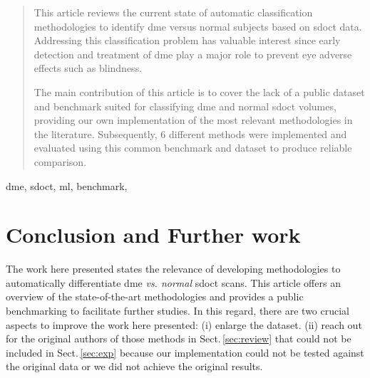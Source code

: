 \documentclass[conference,twocolumn,a4,10pt]{latex/IEEEtran}
\begin{document}

\maketitle

\begin{abstract}
This article reviews the current state of automatic classification methodologies to identify \gls{dme} versus normal subjects based on \gls{sdoct} data.
Addressing this classification problem has valuable interest since early detection and treatment of \gls{dme} play a major role to prevent eye adverse effects such as blindness.

The main contribution of this article is to cover the lack of a public dataset and benchmark suited for classifying \gls{dme} and normal \gls{sdoct} volumes, providing our own implementation of the most relevant methodologies in the literature.
Subsequently, 6 different methods were implemented and evaluated using this common benchmark and dataset to produce reliable comparison.

\end{abstract}

\begin{IEEEkeywords}
  \glsresetall %
  \gls{dme},
  \gls{sdoct},
  \gls{ml},
  benchmark,
\end{IEEEkeywords}

\linenumbers

\glsresetall %





\section{Conclusion and Further work}\label{sec:conclusion}
The work here presented states the relevance of developing methodologies to automatically differentiate \gls{dme} \emph{vs. normal} \gls{sdoct} scans.
This article offers an overview of the state-of-the-art methodologies and provides a public benchmarking to facilitate further studies.
In this regard, there are two crucial aspects to improve the work here presented:
(i) enlarge the dataset.
(ii) reach out for the original authors of those methods in Sect.\,\ref{sec:review} that could not be included in Sect.\,\ref{sec:exp} because our implementation could not be tested against the original data or we did not achieve the original results.
\end{document}
